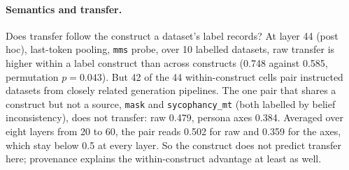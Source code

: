\paragraph{Semantics and transfer.} Does transfer follow the construct a dataset's label records? %
At layer 44 (post hoc), last-token pooling, \texttt{mms} probe, over 10 labelled datasets, raw transfer is higher within a label construct than across constructs (0.748 against 0.585, permutation $p = 0.043$). %
But 42 of the 44 within-construct cells pair instructed datasets from closely related generation pipelines. %
The one pair that shares a construct but not a source, \texttt{mask} and \texttt{sycophancy\_mt} (both labelled by belief inconsistency), does not transfer: raw 0.479, persona axes 0.384. %
Averaged over eight layers from 20 to 60, the pair reads 0.502 for raw and 0.359 for the axes, which stay below 0.5 at every layer. %
So the construct does not predict transfer here; provenance explains the within-construct advantage at least as well. %

